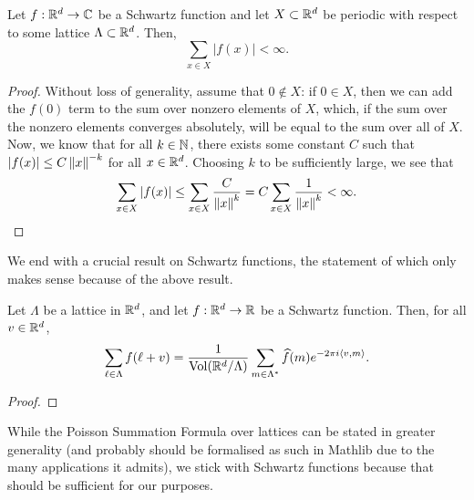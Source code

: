 \begin{lemma}
  Let $f : \mathbb{R}^d \to \mathbb{C}$ be a Schwartz function and let $X \subset \mathbb{R}^d$ be periodic with respect to some lattice $\Lambda \subset \mathbb{R}^d$. Then,
  \[
    \sum_{x \in X} |f(x)| < \infty.
  \]
\end{lemma}
\begin{proof}
  Without loss of generality, assume that $0 \notin X$: if $0 \in X$, then we can add the $f(0)$ term to the sum over nonzero elements of $X$, which, if the sum over the nonzero elements converges absolutely, will be equal to the sum over all of $X$. Now, we know that for all $k \in \mathbb{N}$, there exists some constant $C$ such that $|f(x)| \leq C\left\lVert x \right\rVert^{-k}$ for all $x \in \mathbb{R}^d$. Choosing $k$ to be sufficiently large, we see that
  \[
    \sum_{x \in X} |f(x)| \leq \sum_{x \in X} \frac{C}{\left\lVert x \right\rVert^{k}} = C \sum_{x \in X} \frac{1}{\left\lVert x \right\rVert^k} < \infty.
  \]
\end{proof}

We end with a crucial result on Schwartz functions, the statement of which only makes sense because of the above result.
\begin{theorem}\label{thm:Poisson-summation-formula}
  Let $\Lambda$ be a lattice in $\mathbb{R}^d$, and let $f:\mathbb{R}^d\to\mathbb{R}$ be a Schwartz function. Then, for all $v \in \mathbb{R}^d$,
  \[
    \sum_{\ell\in\Lambda}f(\ell + v) = \frac{1}{\operatorname{Vol}\!\left(\mathbb{R}^d/\Lambda\right)} \sum_{m\in\Lambda^*}\widehat{f}(m) e^{-2\pi i \left\langle v, m \right\rangle}.
  \]
\end{theorem}
\begin{proof}
\end{proof}

While the Poisson Summation Formula over lattices can be stated in greater generality (and probably should be formalised as such in Mathlib due to the many applications it admits), we stick with Schwartz functions because that should be sufficient for our purposes.
